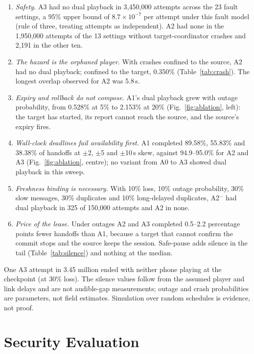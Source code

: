 \documentclass[conference]{IEEEtran}
\begin{document}
\begin{enumerate}
\item \emph{Safety.} A3 had no dual playback in 3{,}450{,}000 attempts across the 23 fault settings, a 95\% upper bound of $8.7\times10^{-7}$ per attempt under this fault model (rule of three, treating attempts as independent). A2 had none in the 1{,}950{,}000 attempts of the 13 settings without target-coordinator crashes and 2{,}191 in the other ten.
\item \emph{The hazard is the orphaned player.} With crashes confined to the source, A2 had no dual playback; confined to the target, 0.350\% (Table~\ref{tab:crash}). The longest overlap observed for A2 was 5.8\,s.
\item \emph{Expiry and rollback do not compose.} A1's dual playback grew with outage probability, from 0.528\% at 5\% to 2.153\% at 20\% (Fig.~\ref{fig:ablation}, left): the target has started, its report cannot reach the source, and the source's expiry fires.
\item \emph{Wall-clock deadlines fail availability first.} A1 completed 89.58\%, 55.83\% and 38.38\% of handoffs at $\pm$2, $\pm$5 and $\pm$10\,s skew, against 94.9--95.0\% for A2 and A3 (Fig.~\ref{fig:ablation}, centre); no variant from A0 to A3 showed dual playback in this sweep.
\item \emph{Freshness binding is necessary.} With 10\% loss, 10\% outage probability, 30\% slow messages, 30\% duplicates and 10\% long-delayed duplicates, A2$^-$ had dual playback in 325 of 150{,}000 attempts and A2 in none.
\item \emph{Price of the lease.} Under outages A2 and A3 completed 0.5--2.2 percentage points fewer handoffs than A1, because a target that cannot confirm the commit stops and the source keeps the session. Safe-pause adds silence in the tail (Table~\ref{tab:silence}) and nothing at the median.
\end{enumerate}

One A3 attempt in 3.45 million ended with neither phone playing at the checkpoint (at 30\% loss). The silence values follow from the assumed player and link delays and are not audible-gap measurements; outage and crash probabilities are parameters, not field estimates. Simulation over random schedules is evidence, not proof.

\section{Security Evaluation}\label{sec:seceval}
\end{document}
